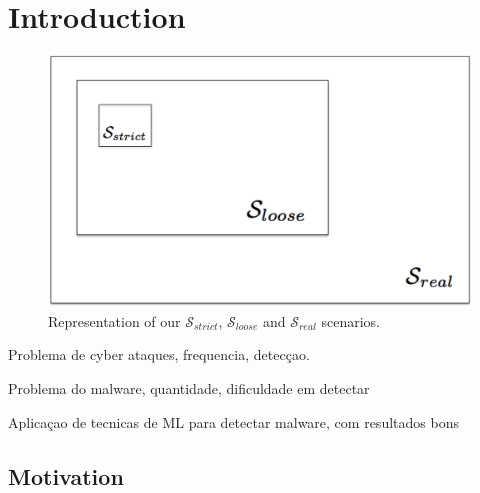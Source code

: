 
\chapter{Introduction}
\label{chapter:introduction}

\begin{figure}[!h]
	\centering
	\includegraphics[width=\columnwidth]{Figures/dataset_sizes.png}
	\caption{Representation of our $\mathcal{S}_{strict}$, $\mathcal{S}_{loose}$ and $\mathcal{S}_{real}$ scenarios.}
	\label{fig:dataset_sizes}
\end{figure}

Problema de cyber ataques, frequencia, detecçao.

Problema do malware, quantidade, dificuldade em detectar

Aplicaçao de tecnicas de ML para detectar malware, com resultados bons


\section{Motivation}
\label{section:motivation}

